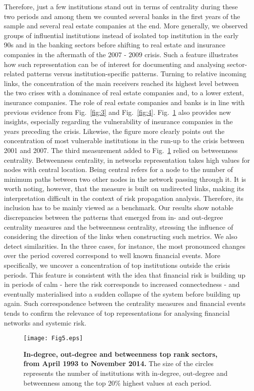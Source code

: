 \documentclass[a4paper,10pt]{article}
\begin{document}
Therefore, just a few institutions stand out in terms of centrality during these two periods and among 
them we counted several banks in the first years of the sample and several real estate companies at the end. More generally, 
we observed groups of influential institutions instead of isolated top institution in the early 90s and in the banking sectors
before shifting to real estate and insurance companies in the aftermath of the $2007$ - $2009$ crisis. Such a feature illustrates 
how such representation can be of interest for documenting and analysing sector-related patterns versus institution-specific 
patterns. Turning to relative incoming links, the concentration of the main receivers reached its highest level between the 
two crises with a dominance of real estate companies and, to a lower extent, insurance companies. The role of real estate 
companies and banks is in line with previous evidence from Fig.~\ref{fig:3} and Fig.~\ref{fig:4}. Fig.~\ref{fig:5} also
provides new insights, especially regarding the vulnerability of insurance companies in the years preceding the crisis. Likewise, the figure more clearly 
points out the concentration of most vulnerable institutions in the run-up to the crisis between 2001 and 2007. The third measurement added to Fig.~\ref{fig:5}
relied on betweenness centrality. Betweenness centrality, in networks representation takes high values for
nodes with central location. Being central refers for a node to the number of minimum paths between
two other nodes in the network passing through it. It is worth noting, however, that the measure is
built on undirected links, making its interpretation difficult in the context of risk propagation analysis.
Therefore, its inclusion has to be mainly viewed as a benchmark. Our results show notable discrepancies
between the patterns that emerged from in- and out-degree centrality measures and the betweenness
centrality, stressing the influence of considering the direction of the links when constructing such metrics.
We also detect similarities. In the three cases, for instance, the most pronounced changes over the period
covered correspond to well known financial events. More specifically, we uncover a concentration of
top institutions outside the crisis periods. This feature is consistent with the idea that financial risk is
building up in periods of calm - here the risk corresponds to increased connectedness - and eventually
materialised into a sudden collapse of the system before building up again. Such correspondence between
the centrality measures and financial events tends to confirm the relevance of top representations for
analysing financial networks and systemic risk.
\begin{figure}[!h]
\texttt{[image: Fig5.eps]}
\caption{{\bf In-degree, out-degree and betweenness top rank sectors, from April 1993 to November 2014.} The size of the circles represents the number of 
institutions with in-degree, out-degree and betweenness among the top $20\%$ highest values at each period.}
\label{fig:5} 
\end{figure}
\end{document}
